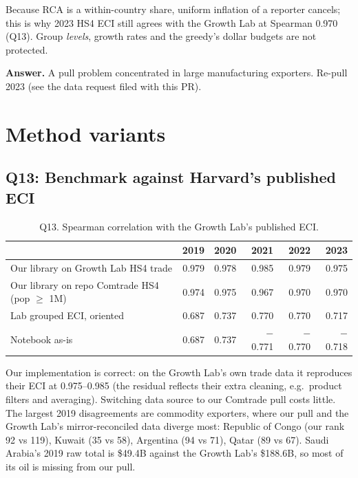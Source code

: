 \documentclass[11pt]{article}
\begin{document}
Because RCA is a within-country share, uniform inflation of a reporter cancels; this is why 2023 HS4 ECI still agrees with the Growth Lab at Spearman 0.970 (Q13). Group \emph{levels}, growth rates and the greedy's dollar budgets are not protected.

\textbf{Answer.} A pull problem concentrated in large manufacturing exporters. Re-pull 2023 (see the data request filed with this PR).

\section{Method variants}

\subsection{Q13: Benchmark against Harvard's published ECI}\label{sec:q13}

\begin{table}[H]\centering\small
\caption{Q13. Spearman correlation with the Growth Lab's published ECI.}\label{tab:q13}
\begin{tabular}{lrrrrr}
\toprule
 & 2019 & 2020 & 2021 & 2022 & 2023 \\
\midrule
Our library on Growth Lab HS4 trade & 0.979 & 0.978 & 0.985 & 0.979 & 0.975 \\
Our library on repo Comtrade HS4 (pop $\ge$ 1M) & 0.974 & 0.975 & 0.967 & 0.970 & 0.970 \\
Lab grouped ECI, oriented & 0.687 & 0.737 & 0.770 & 0.770 & 0.717 \\
Notebook as-is & 0.687 & 0.737 & $-$0.771 & $-$0.770 & $-$0.718 \\
\bottomrule
\end{tabular}
\end{table}

Our implementation is correct: on the Growth Lab's own trade data it reproduces their ECI at 0.975--0.985 (the residual reflects their extra cleaning, e.g.\ product filters and averaging). Switching data source to our Comtrade pull costs little. The largest 2019 disagreements are commodity exporters, where our pull and the Growth Lab's mirror-reconciled data diverge most: Republic of Congo (our rank 92 vs 119), Kuwait (35 vs 58), Argentina (94 vs 71), Qatar (89 vs 67). Saudi Arabia's 2019 raw total is \$49.4B against the Growth Lab's \$188.6B, so most of its oil is missing from our pull.
\end{document}
